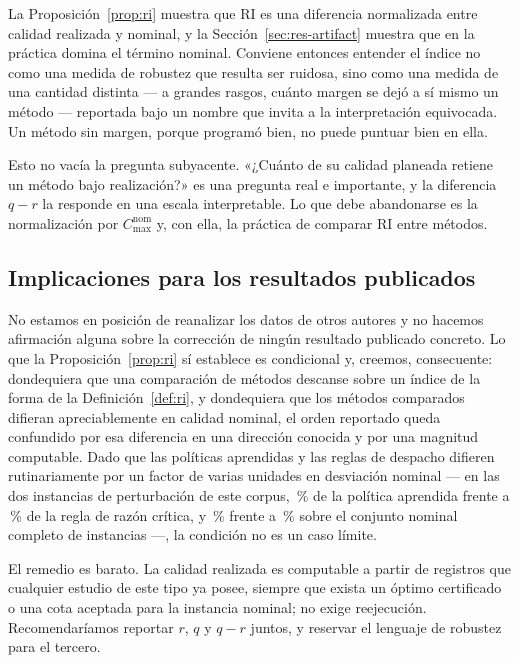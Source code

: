 \documentclass[a4paper,fleqn]{cas-sc}
\newcommand{\Cmax}{C_{\max}}
\newcommand{\RI}{\mathrm{RI}}
\begin{document}
La Proposición~\ref{prop:ri} muestra que $\RI$ es una diferencia normalizada
entre calidad realizada y nominal, y la Sección~\ref{sec:res-artifact} muestra
que en la práctica domina el término nominal. Conviene entonces entender el
índice no como una medida de robustez que resulta ser ruidosa, sino como una
medida de una cantidad distinta --- a grandes rasgos, cuánto margen se dejó a sí
mismo un método --- reportada bajo un nombre que invita a la interpretación
equivocada. Un método sin margen, porque programó bien, no puede puntuar bien en
ella.

Esto no vacía la pregunta subyacente. «¿Cuánto de su calidad planeada retiene un
método bajo realización?» es una pregunta real e importante, y la diferencia
$q-r$ la responde en una escala interpretable. Lo que debe abandonarse es la
normalización por $\Cmax^{\text{nom}}$ y, con ella, la práctica de comparar
$\RI$ entre métodos.

\subsection{Implicaciones para los resultados publicados}

No estamos en posición de reanalizar los datos de otros autores y no hacemos
afirmación alguna sobre la corrección de ningún resultado publicado concreto. Lo
que la Proposición~\ref{prop:ri} sí establece es condicional y, creemos,
consecuente: dondequiera que una comparación de métodos descanse sobre un índice
de la forma de la Definición~\ref{def:ri}, y dondequiera que los métodos
comparados difieran apreciablemente en calidad nominal, el orden reportado queda
confundido por esa diferencia en una dirección conocida y por una magnitud
computable. Dado que las políticas aprendidas y las reglas de despacho difieren
rutinariamente por un factor de varias unidades en desviación nominal --- en
las dos instancias de perturbación de este corpus, \NomRlTwo{}\,\% de la
política aprendida frente a \NomCrTwo{}\,\% de la regla de razón crítica, y
\NomRlAll{}\,\% frente a \NomCrAll{}\,\% sobre el conjunto nominal completo de
\NInstances{} instancias ---, la condición no es un caso límite.

El remedio es barato. La calidad realizada es computable a partir de registros
que cualquier estudio de este tipo ya posee, siempre que exista un óptimo
certificado o una cota aceptada para la instancia nominal; no exige
reejecución. Recomendaríamos reportar $r$, $q$ y $q-r$ juntos, y reservar el
lenguaje de robustez para el tercero.
\end{document}

